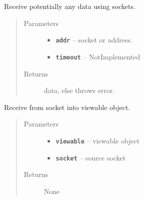 \documentclass[letterpaper,10pt,english]{sphinxmanual}
\begin{document}
\begin{fulllineitems}
\label{RRtoolbox.lib:RRtoolbox.lib.serverServices.rcvPickle}
Receive potentially any data using sockets.
\begin{quote}\begin{description}
\item[{Parameters}] \leavevmode\begin{itemize}
\item {} 
\textbf{\texttt{addr}} -- socket or address.

\item {} 
\textbf{\texttt{timeout}} -- NotImplemented

\end{itemize}

\item[{Returns}] \leavevmode
data, else throws error.

\end{description}\end{quote}

\end{fulllineitems}


\begin{fulllineitems}
\label{RRtoolbox.lib:RRtoolbox.lib.serverServices.recv_into}
Receive from socket into viewable object.
\begin{quote}\begin{description}
\item[{Parameters}] \leavevmode\begin{itemize}
\item {} 
\textbf{\texttt{viewable}} -- viewable object

\item {} 
\textbf{\texttt{socket}} -- source socket

\end{itemize}

\item[{Returns}] \leavevmode
None

\end{description}\end{quote}

\end{fulllineitems}
\end{document}
